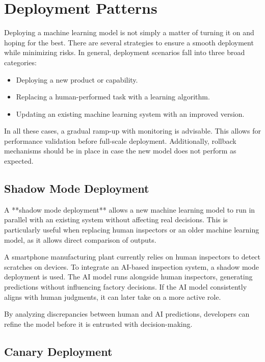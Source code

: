 \documentclass[12pt,openany]{book}
\begin{document}
\chapter{Deployment Patterns}

Deploying a machine learning model is not simply a matter of turning it on and hoping for the best. There are several strategies to ensure a smooth deployment while minimizing risks. In general, deployment scenarios fall into three broad categories:

\begin{itemize}
    \item Deploying a new product or capability.
    \item Replacing a human-performed task with a learning algorithm.
    \item Updating an existing machine learning system with an improved version.
\end{itemize}

In all these cases, a gradual ramp-up with monitoring is advisable. This allows for performance validation before full-scale deployment. Additionally, rollback mechanisms should be in place in case the new model does not perform as expected.

\section{Shadow Mode Deployment}

A **shadow mode deployment** allows a new machine learning model to run in parallel with an existing system without affecting real decisions. This is particularly useful when replacing human inspectors or an older machine learning model, as it allows direct comparison of outputs.

\begin{examplebox}
   A smartphone manufacturing plant currently relies on human inspectors to detect scratches on devices. To integrate an AI-based inspection system, a shadow mode deployment is used. The AI model runs alongside human inspectors, generating predictions without influencing factory decisions. If the AI model consistently aligns with human judgments, it can later take on a more active role.
\end{examplebox}

By analyzing discrepancies between human and AI predictions, developers can refine the model before it is entrusted with decision-making.

\section{Canary Deployment}
\end{document}
